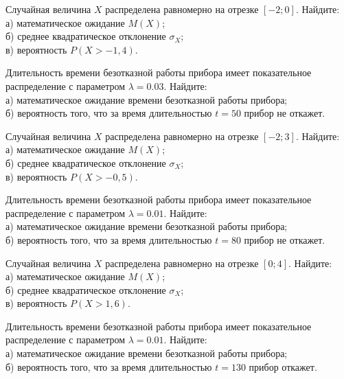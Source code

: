\vfill

\newpage\setcounter{zad}{0}

\z Случайная величина $X$ распределена равномерно на отрезке $[-2; 0]$. Найдите: \\ \quad а) математическое ожидание $M(X)$; \\ \quad б) среднее квадратическое отклонение $\sigma_X$; \\ \quad в) вероятность $P(X>-1{,}4)$.


\vfill

\z Длительность времени безотказной работы прибора имеет показательное распределение с параметром $\lambda = 0.03$. Найдите: \\ \quad а) математическое ожидание времени безотказной работы прибора; \\ \quad б) вероятность того, что за время длительностью $t = 50$ прибор не откажет.
 

\vfill

\newpage\setcounter{zad}{0}

\z Случайная величина $X$ распределена равномерно на отрезке $[-2; 3]$. Найдите: \\ \quad а) математическое ожидание $M(X)$; \\ \quad б) среднее квадратическое отклонение $\sigma_X$; \\ \quad в) вероятность $P(X>-0{,}5)$.


\vfill

\z Длительность времени безотказной работы прибора имеет показательное распределение с параметром $\lambda = 0.01$. Найдите: \\ \quad а) математическое ожидание времени безотказной работы прибора; \\ \quad б) вероятность того, что за время длительностью $t = 80$ прибор не откажет.
 

\vfill

\newpage\setcounter{zad}{0}

\z Случайная величина $X$ распределена равномерно на отрезке $[0; 4]$. Найдите: \\ \quad а) математическое ожидание $M(X)$; \\ \quad б) среднее квадратическое отклонение $\sigma_X$; \\ \quad в) вероятность $P(X>1{,}6)$.


\vfill

\z Длительность времени безотказной работы прибора имеет показательное распределение с параметром $\lambda = 0.01$. Найдите: \\ \quad а) математическое ожидание времени безотказной работы прибора; \\ \quad б) вероятность того, что за время длительностью $t = 130$ прибор откажет.
 

